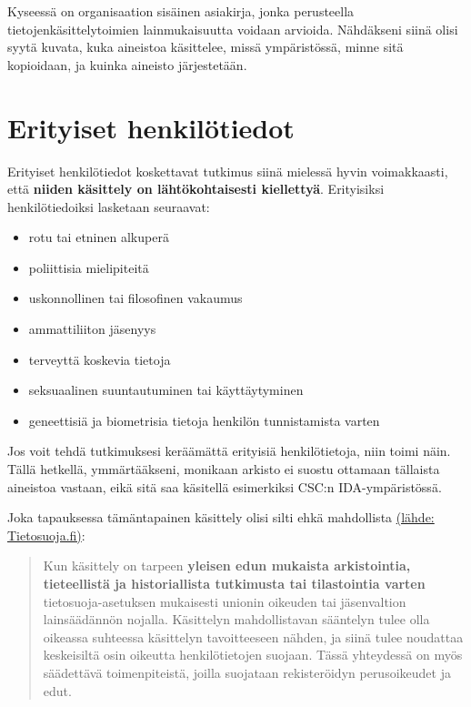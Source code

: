 \documentclass[]{book}
\providecommand{\tightlist}{%
  \setlength{\itemsep}{0pt}\setlength{\parskip}{0pt}}
\begin{document}
Kyseessä on organisaation sisäinen asiakirja, jonka perusteella
tietojenkäsittelytoimien lainmukaisuutta voidaan arvioida. Nähdäkseni
siinä olisi syytä kuvata, kuka aineistoa käsittelee, missä ympäristössä,
minne sitä kopioidaan, ja kuinka aineisto järjestetään.

\hypertarget{erityiset-henkilotiedot}{%
\section{Erityiset henkilötiedot}\label{erityiset-henkilotiedot}}

Erityiset henkilötiedot koskettavat tutkimus siinä mielessä hyvin
voimakkaasti, että \textbf{niiden käsittely on lähtökohtaisesti
kiellettyä}. Erityisiksi henkilötiedoiksi lasketaan seuraavat:

\begin{itemize}
\tightlist
\item
  rotu tai etninen alkuperä
\item
  poliittisia mielipiteitä
\item
  uskonnollinen tai filosofinen vakaumus
\item
  ammattiliiton jäsenyys
\item
  terveyttä koskevia tietoja
\item
  seksuaalinen suuntautuminen tai käyttäytyminen
\item
  geneettisiä ja biometrisia tietoja henkilön tunnistamista varten
\end{itemize}

Jos voit tehdä tutkimuksesi keräämättä erityisiä henkilötietoja, niin
toimi näin. Tällä hetkellä, ymmärtääkseni, monikaan arkisto ei suostu
ottamaan tällaista aineistoa vastaan, eikä sitä saa käsitellä
esimerkiksi CSC:n IDA-ympäristössä.

Joka tapauksessa tämäntapainen käsittely olisi silti ehkä mahdollista
\href{https://tietosuoja.fi/erityisten-henkilotietoryhmien-kasittely}{(lähde:
Tietosuoja.fi)}:

\begin{quote}
Kun käsittely on tarpeen \textbf{yleisen edun mukaista arkistointia,
tieteellistä ja historiallista tutkimusta tai tilastointia varten}
tietosuoja-asetuksen mukaisesti unionin oikeuden tai jäsenvaltion
lainsäädännön nojalla. Käsittelyn mahdollistavan sääntelyn tulee olla
oikeassa suhteessa käsittelyn tavoitteeseen nähden, ja siinä tulee
noudattaa keskeisiltä osin oikeutta henkilötietojen suojaan. Tässä
yhteydessä on myös säädettävä toimenpiteistä, joilla suojataan
rekisteröidyn perusoikeudet ja edut.
\end{quote}
\end{document}
